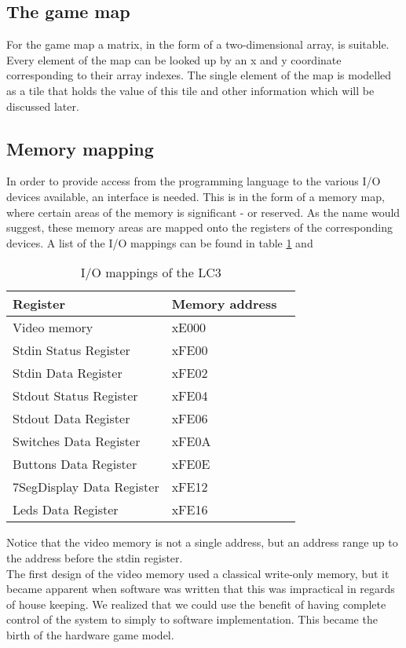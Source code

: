 \documentclass{acm_proc_article-sp}
\begin{document}
\subsection{The game map}
For the game map a matrix, in the form of a two-dimensional array, is suitable. Every element of the map can be looked up by an x and y coordinate corresponding to their array indexes. The single element of the map is modelled as a tile that holds the value of this tile and other information which will be discussed later.

\subsection{Memory mapping}
In order to provide access from the programming language to the various I/O devices available, an interface is needed. This is in the form of a memory map, where certain areas of the memory is significant - or reserved. As the name would suggest, these memory areas are mapped onto the registers of the corresponding devices. A list of the I/O mappings can be found in table \ref{table:io_mappings} and \cite{patt2000introduction}

\begin{table}[h]
\centering
    \begin{tabular}{ | l | l | l |}
    \hline
     Register & Memory address \\ \hline 
    \hline
    Video memory           & xE000  \\ \hline
    Stdin Status Register  & xFE00  \\ \hline
    Stdin Data Register    & xFE02  \\ \hline
    Stdout Status Register & xFE04  \\ \hline
    Stdout Data Register   & xFE06  \\ \hline
    Switches Data Register & xFE0A  \\ \hline
    Buttons Data Register  & xFE0E  \\ \hline
    7SegDisplay Data Register  & xFE12  \\ \hline
    Leds Data Register  & xFE16  \\ \hline
    \end{tabular}
\caption{I/O mappings of the LC3}
\label{table:io_mappings}
\end{table}
Notice that the video memory is not a single address, but an address range up to the address before the stdin register.\\
The first design of the video memory used a classical write-only memory, but it became apparent when software was written that this was impractical in regards of house keeping. We realized that we could use the benefit of having complete control of the system to simply to software implementation. This became the birth of the hardware game model.
\end{document}
